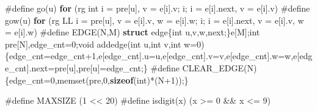 \documentclass[
]{article}
\newenvironment{Shaded}{}{}
\newcommand{\CharTok}[1]{\textcolor[rgb]{0.25,0.44,0.63}{#1}}
\newcommand{\ControlFlowTok}[1]{\textcolor[rgb]{0.00,0.44,0.13}{\textbf{#1}}}
\newcommand{\DataTypeTok}[1]{\textcolor[rgb]{0.56,0.13,0.00}{#1}}
\newcommand{\DecValTok}[1]{\textcolor[rgb]{0.25,0.63,0.44}{#1}}
\newcommand{\KeywordTok}[1]{\textcolor[rgb]{0.00,0.44,0.13}{\textbf{#1}}}
\newcommand{\NormalTok}[1]{#1}
\newcommand{\PreprocessorTok}[1]{\textcolor[rgb]{0.74,0.48,0.00}{#1}}
\begin{document}
\begin{Shaded}
\begin{Highlighting}[]
\PreprocessorTok{\#define go}\NormalTok{(u)}\PreprocessorTok{ }\ControlFlowTok{for}\PreprocessorTok{ }\NormalTok{(rg}\PreprocessorTok{ }\DataTypeTok{int}\PreprocessorTok{ }\NormalTok{i}\PreprocessorTok{ }\NormalTok{=}\PreprocessorTok{ }\NormalTok{pre[u],}\PreprocessorTok{ }\NormalTok{v}\PreprocessorTok{ }\NormalTok{=}\PreprocessorTok{ }\NormalTok{e[i].v;}\PreprocessorTok{ }\NormalTok{i;}\PreprocessorTok{ }\NormalTok{i}\PreprocessorTok{ }\NormalTok{=}\PreprocessorTok{ }\NormalTok{e[i].next,}\PreprocessorTok{ }\NormalTok{v}\PreprocessorTok{ }\NormalTok{=}\PreprocessorTok{ }\NormalTok{e[i].v)}
\PreprocessorTok{\#define gow}\NormalTok{(u)}\PreprocessorTok{ }\ControlFlowTok{for}\PreprocessorTok{ }\NormalTok{(rg}\PreprocessorTok{ }\NormalTok{LL}\PreprocessorTok{ }\NormalTok{i}\PreprocessorTok{ }\NormalTok{=}\PreprocessorTok{ }\NormalTok{pre[u],}\PreprocessorTok{ }\NormalTok{v}\PreprocessorTok{ }\NormalTok{=}\PreprocessorTok{ }\NormalTok{e[i].v,}\PreprocessorTok{ }\NormalTok{w}\PreprocessorTok{ }\NormalTok{=}\PreprocessorTok{ }\NormalTok{e[i].w;}\PreprocessorTok{ }\NormalTok{i;}\PreprocessorTok{ }\NormalTok{i}\PreprocessorTok{ }\NormalTok{=}\PreprocessorTok{ }\NormalTok{e[i].next,}\PreprocessorTok{ }\NormalTok{v}\PreprocessorTok{ }\NormalTok{=}\PreprocessorTok{ }\NormalTok{e[i].v,}\PreprocessorTok{ }\NormalTok{w}\PreprocessorTok{ }\NormalTok{=}\PreprocessorTok{ }\NormalTok{e[i].w)}
\PreprocessorTok{\#define EDGE}\NormalTok{(N,M)}\PreprocessorTok{ }\KeywordTok{struct}\PreprocessorTok{ }\NormalTok{edge\{}\DataTypeTok{int}\PreprocessorTok{ }\NormalTok{u,v,w,next;\}e[M];}\DataTypeTok{int}\PreprocessorTok{ }\NormalTok{pre[N],edge\_cnt=}\DecValTok{0}\NormalTok{;}\DataTypeTok{void}\PreprocessorTok{ }\NormalTok{addedge(}\DataTypeTok{int}\PreprocessorTok{ }\NormalTok{u,}\DataTypeTok{int}\PreprocessorTok{ }\NormalTok{v,}\DataTypeTok{int}\PreprocessorTok{ }\NormalTok{w=}\DecValTok{0}\NormalTok{)\{edge\_cnt=edge\_cnt+}\DecValTok{1}\NormalTok{,e[edge\_cnt].u=u,e[edge\_cnt].v=v,e[edge\_cnt].w=w,e[edge\_cnt].next=pre[u],pre[u]=edge\_cnt;\}}
\PreprocessorTok{\#define CLEAR\_EDGE}\NormalTok{(N)}\PreprocessorTok{ }\NormalTok{\{edge\_cnt=}\DecValTok{0}\NormalTok{,memset(pre,}\DecValTok{0}\NormalTok{,}\KeywordTok{sizeof}\NormalTok{(}\DataTypeTok{int}\NormalTok{)*(N+}\DecValTok{1}\NormalTok{));\}}
  
\PreprocessorTok{\#define MAXSIZE }\NormalTok{(}\DecValTok{1}\PreprocessorTok{ }\NormalTok{\textless{}\textless{}}\PreprocessorTok{ }\DecValTok{20}\NormalTok{)}
\PreprocessorTok{\#define isdigit}\NormalTok{(x)}\PreprocessorTok{ }\NormalTok{(x}\PreprocessorTok{ }\NormalTok{\textgreater{}=}\PreprocessorTok{ }\CharTok{\textquotesingle{}0\textquotesingle{}}\PreprocessorTok{ }\NormalTok{\&\&}\PreprocessorTok{ }\NormalTok{x}\PreprocessorTok{ }\NormalTok{\textless{}=}\PreprocessorTok{ }\CharTok{\textquotesingle{}9\textquotesingle{}}\NormalTok{)}
  

\end{Highlighting}
\end{Shaded}
\end{document}
